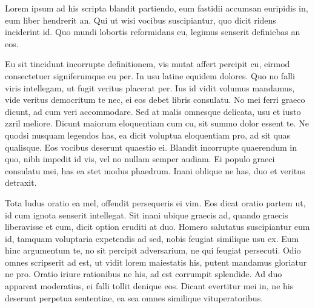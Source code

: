 \documentclass{memoria}
\begin{document}


\indices



Lorem ipsum ad his scripta blandit partiendo, eum fastidii accumsan euripidis
in, eum liber hendrerit an. Qui ut wisi vocibus suscipiantur, quo dicit ridens
inciderint id. Quo mundi lobortis reformidans eu, legimus senserit definiebas an
eos. 

Eu sit tincidunt incorrupte definitionem, vis mutat affert percipit cu,
eirmod consectetuer signiferumque eu per. In usu latine equidem dolores. Quo no
falli viris intellegam, ut fugit veritus placerat per. Ius id vidit volumus
mandamus, vide veritus democritum te nec, ei eos debet libris consulatu. No mei
ferri graeco dicunt, ad cum veri accommodare. Sed at malis omnesque delicata,
usu et iusto zzril meliore. Dicunt maiorum eloquentiam cum cu, sit summo dolor
essent te. Ne quodsi nusquam legendos has, ea dicit voluptua eloquentiam pro, ad
sit quas qualisque. Eos vocibus deserunt quaestio ei. Blandit incorrupte
quaerendum in quo, nibh impedit id vis, vel no nullam semper audiam. Ei populo
graeci consulatu mei, has ea stet modus phaedrum. Inani oblique ne has, duo et
veritus detraxit. 



Tota ludus oratio ea mel, offendit persequeris ei vim. Eos
dicat oratio partem ut, id cum ignota senserit intellegat. Sit inani ubique
graecis ad, quando graecis liberavisse et cum, dicit option eruditi at duo.
Homero salutatus suscipiantur eum id, tamquam voluptaria expetendis ad sed,
nobis feugiat similique usu ex. Eum hinc argumentum te, no sit percipit
adversarium, ne qui feugiat persecuti. Odio omnes scripserit ad est, ut vidit
lorem maiestatis his, putent mandamus gloriatur ne pro. Oratio iriure rationibus
ne his, ad est corrumpit splendide. Ad duo appareat moderatius, ei falli tollit
denique eos. Dicant evertitur mei in, ne his deserunt perpetua sententiae, ea
sea omnes similique vituperatoribus. 


\end{document}
